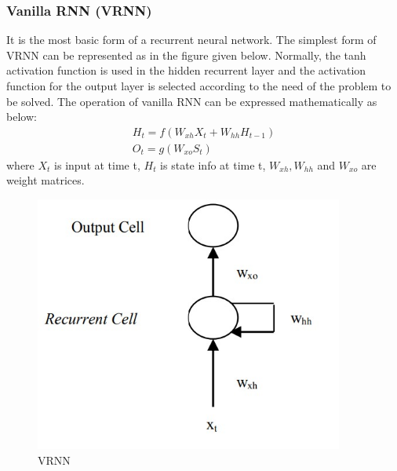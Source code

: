 \subsubsection{Vanilla RNN (VRNN)}
\vspace{-18pt}
It is the most basic form of a recurrent neural network. The simplest form of VRNN can be represented as in the figure given below. Normally, the tanh activation function is used in the hidden recurrent layer and the activation function for the output layer is selected according to the need of the problem to be solved. The operation of vanilla RNN can be expressed mathematically as below:
\begin{eqnarray}
H_t = f(W_{xh}X_t + W_{hh}H_{t-1})\\
O_t = g(W_{xo}S_t)
\end{eqnarray}
where $X_t$ is input at time t, $H_t$ is state info at time t, $W_{xh},W_{hh}$ and $W_{xo}$ are weight matrices.\newpage
\begin{figure}[tbh] %
\begin{center}
	\includegraphics[width=4in]{images/vrnn.jpg} 
	\caption{VRNN} %
	\label{VRNN} %
\end{center}
\end{figure}
